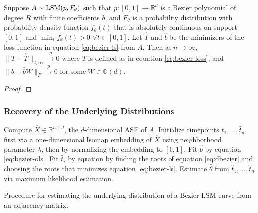 \documentclass[12pt]{article}
\begin{document}
\begin{theorem}
\label{thm:bezier-consistency}
Suppose $A \sim \mathrm{LSM}(p, F_\theta)$ such that $p : [0, 1] \to \mathbb{R}^d$ is a Bezier polynomial of degree $R$ with finite coefficients $b$, and $F_\theta$ is a probability distribution with probability density function $f_\theta(t)$ that is absolutely continuous on support $[0, 1]$ and $\min_t f_\theta(t) > 0$ $\forall t \in [0, 1]$. 
Let $\hat{T}$ and $\hat{b}$ be the minimizers of the loss function in equation \ref{eq:bezier-ls} from $A$. 
Then as $n \to \infty$, $\|T - \hat{T}\|_{2, \infty} \stackrel{p}{\to} 0$ where $T$ is defined as in equation \ref{eq:bezier-loss}, and $\|b - \hat{b} W \|_F \stackrel{p}{\to} 0$ for some $W \in \mathbb{O}(d)$.
\end{theorem}

\begin{proof}

\end{proof}

\hypertarget{recovery-of-the-underlying-distributions}{%
\subsubsection{Recovery of the Underlying
Distributions}\label{recovery-of-the-underlying-distributions}}

\begin{algorithm}[H]
\label{alg:bezier-param-fit}
\DontPrintSemicolon
\SetAlgoLined
{}
Compute $\hat{X} \in \mathbb{R}^{n \times d}$, the $d$-dimensional ASE of $A$.\;
Initialize timepoints $\hat{t}_1, ..., \hat{t}_n$, first via a one-dimensional Isomap embedding of $\hat{X}$ using neighborhood parameter $\lambda$, then by normalizing the embedding to $[0, 1]$.\;
 {
  Fit $\hat{b}$ by equation \ref{eq:bezier-ols}.\;
   {
    Fit $\hat{t}_i$ by equation by finding the roots of equation \ref{eq:dbezier} and choosing the roots that minimizes equation \ref{eq:bezier-ls}.\;
  }
}
Estimate $\hat{\theta}$ from $\hat{t}_1, ..., \hat{t}_n$ via maximum likelihood estimation.\; 
\caption{Procedure for estimating the underlying distribution of a Bezier LSM curve from an adjacency matrix.}
\end{algorithm}
\end{document}
